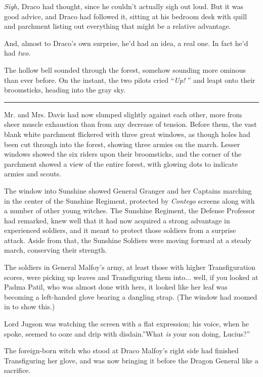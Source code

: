 \emph{Sigh,} Draco had thought, since he couldn't actually sigh out
loud. But it was good advice, and Draco had followed it, sitting at his
bedroom desk with quill and parchment listing out everything that might
be a relative advantage.

And, almost to Draco's own surprise, he'd had an idea, a real one. In
fact he'd had \emph{two.}

The hollow bell sounded through the forest, somehow sounding more
ominous than ever before. On the instant, the two pilots cried
``\emph{Up!} '' and leapt onto their broomsticks, heading into the gray
sky.

\begin{center}\rule{3in}{0.4pt}\end{center}

Mr. and Mrs. Davis had now slumped slightly against each other, more
from sheer muscle exhaustion than from any decrease of tension. Before
them, the vast blank white parchment flickered with three great windows,
as though holes had been cut through into the forest, showing three
armies on the march. Lesser windows showed the six riders upon their
broomsticks, and the corner of the parchment showed a view of the entire
forest, with glowing dots to indicate armies and scouts.

The window into Sunshine showed General Granger and her Captains
marching in the center of the Sunshine Regiment, protected by
\emph{Contego} screens along with a number of other young witches. The
Sunshine Regiment, the Defense Professor had remarked, knew well that it
had now acquired a strong advantage in experienced soldiers, and it
meant to protect those soldiers from a surprise attack. Aside from that,
the Sunshine Soldiers were moving forward at a steady march, conserving
their strength.

The soldiers in General Malfoy's army, at least those with higher
Transfiguration scores, were picking up leaves and Transfiguring them
into... well, if you looked at Padma Patil, who was almost done
with hers, it looked like her leaf was becoming a left-handed glove
bearing a dangling strap. (The window had zoomed in to show this.)

Lord Jugson was watching the screen with a flat expression; his voice,
when he spoke, seemed to ooze and drip with disdain.''What \emph{is}
your son doing, Lucius?''

The foreign-born witch who stood at Draco Malfoy's right side had
finished Transfiguring her glove, and was now bringing it before the
Dragon General like a sacrifice.

